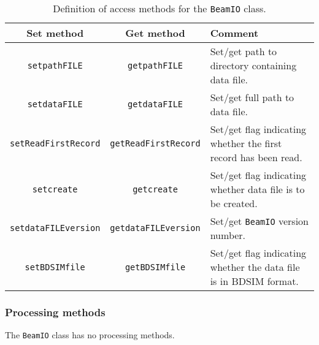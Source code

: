 \begin{table}[h]
  \caption{
    Definition of access methods for the \texttt{BeamIO}
    class. 
  }
  \label{Tab:BmIO:AccessMethods}
  \begin{center}
    \begin{tabular}{|c|c|p{7.5cm}|}
      \hline
      \textbf{Set method} & \textbf{Get method}  & \textbf{Comment}                                                                 \\
      \hline
      \texttt{setpathFILE}        & \texttt{getpathFILE}        & Set/get path to directory containing data file.                   \\
      \texttt{setdataFILE}        & \texttt{getdataFILE}        & Set/get full path to data file.                                   \\
      \texttt{setReadFirstRecord} & \texttt{getReadFirstRecord} & Set/get flag indicating whether the first record has been read.   \\
      \texttt{setcreate}          & \texttt{getcreate}          & Set/get flag indicating whether data file is to be created.       \\
      \texttt{setdataFILEversion} & \texttt{getdataFILEversion} & Set/get \texttt{BeamIO} version number.                           \\
      \texttt{setBDSIMfile}       & \texttt{getBDSIMfile}       & Set/get flag indicating whether the data file is in BDSIM format. \\
      \hline
    \end{tabular}
  \end{center}
\end{table}

\subsubsection{Processing methods}
\noindent
The \texttt{BeamIO} class has no processing methods.

